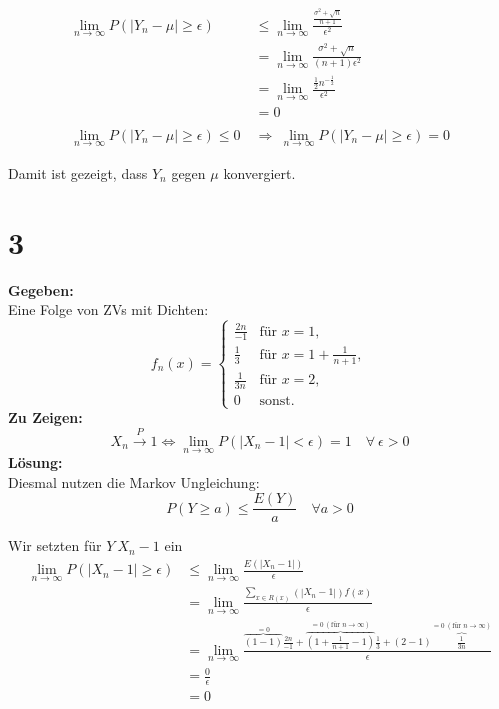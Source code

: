 \documentclass{article}
\begin{document}
\begin{align*}
    \lim_{n \rightarrow \infty}P(|Y_n - \mu| \geq \epsilon) &\leq \lim_{n \rightarrow \infty}\frac{\frac{\sigma^2 + \sqrt{n}}{n+1}}{\epsilon^2} \\
    &= \lim_{n \rightarrow \infty} \frac{\sigma^2 + \sqrt{n}}{(n + 1) \epsilon^2 } \tag*{L'Hopital }  \\
    &= \lim_{n \rightarrow \infty} \frac{\frac{1}{2}n^{-\frac{1}{2}}}{\epsilon^2} \\
    &= 0 \\ \\
    \lim_{n \rightarrow \infty}P(|Y_n - \mu| \geq \epsilon) \leq 0 ~ &\Longrightarrow ~ \lim_{n \rightarrow \infty}P(|Y_n - \mu| \geq \epsilon) = 0 
\end{align*}

Damit ist gezeigt, dass $Y_n$ gegen $\mu$ konvergiert.
\section*{3}
\textbf{Gegeben:} \\

Eine Folge von ZVs mit Dichten:
\[f_n(x)= \begin{cases}
    \frac{2n}{-1}&\text{für } x=1,\\
    \frac{1}{3} &\text{für } x = 1 + \frac{1}{n+1},\\
    \frac{1}{3n} &\text{für } x = 2, \\
    0 &\text{sonst}.  
\end{cases}\]
\textbf{Zu Zeigen:}\\

\[X_n \overset{P}{\rightarrow} 1 \Leftrightarrow \lim_{n \rightarrow \infty} P(|X_n - 1| < \epsilon) = 1 \quad \forall ~ \epsilon>0 \] 
\textbf{Lösung:} \\

Diesmal nutzen die Markov Ungleichung:
\[P(Y \geq a) \leq \frac{E(Y)}{a} \quad \forall a > 0\]

Wir setzten für $Y ~ X_n - 1$ ein 
\begin{align*}
    \lim_{n \rightarrow \infty}P(|X_n-1| \geq \epsilon) &\leq \lim_{n \rightarrow \infty} \frac{E(|X_n -1|)}{\epsilon} \\
    &= \lim_{n \rightarrow \infty} \frac{\sum_{x \in R(x)}(|X_n - 1|) f(x)}{\epsilon} \tag*{Ab hier fällt Betrag weg weil eh positiv (oder Null)}\\
    &= \lim_{n \rightarrow \infty} \frac{\overbrace{(1 - 1)}^{=0}\frac{2n}{-1} + \overbrace{(1+ \frac{1}{n+1} - 1)}^{= 0 ~(\text{für } n \rightarrow\infty)} \frac{1}{3} + (2-1)\overbrace{\frac{1}{3n}}^{= 0 ~(\text{für }n \rightarrow\infty)}}{\epsilon} \\
    &= \frac{0}{\epsilon} \\
    &= 0
\end{align*} 
\end{document}
